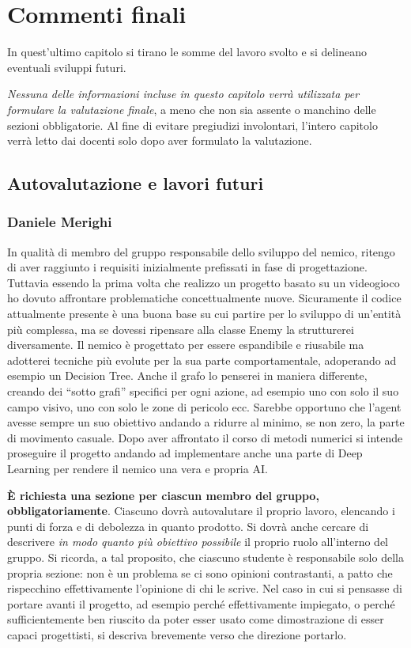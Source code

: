 \documentclass[a4paper,12pt]{report}
\begin{document}
\chapter{Commenti finali}

In quest'ultimo capitolo si tirano le somme del lavoro svolto e si delineano eventuali sviluppi
futuri.

\textit{Nessuna delle informazioni incluse in questo capitolo verrà utilizzata per formulare la valutazione finale}, a meno che non sia assente o manchino delle sezioni obbligatorie.
%
Al fine di evitare pregiudizi involontari, l'intero capitolo verrà letto dai docenti solo dopo aver formulato la valutazione.

\section{Autovalutazione e lavori futuri}
\subsection{Daniele Merighi}
\par
In qualità di membro del gruppo responsabile dello sviluppo del nemico, ritengo di aver raggiunto i requisiti inizialmente prefissati in fase di progettazione. Tuttavia essendo la prima volta che realizzo un progetto basato su un videogioco ho dovuto affrontare problematiche concettualmente nuove. Sicuramente il codice attualmente presente è una buona base su cui partire per lo sviluppo di un’entità più complessa, ma se dovessi ripensare alla classe Enemy la strutturerei diversamente. Il nemico è progettato per essere espandibile e riusabile ma adotterei tecniche più evolute per la sua parte comportamentale, adoperando ad esempio un Decision Tree. Anche il grafo lo penserei in maniera differente, creando dei “sotto grafi” specifici per ogni azione, ad esempio uno con solo il suo campo visivo, uno con solo le zone di pericolo ecc. Sarebbe opportuno che l’agent avesse sempre un suo obiettivo andando a ridurre al minimo, se non zero, la parte di movimento casuale. Dopo aver affrontato il corso di metodi numerici si intende proseguire il progetto andando ad implementare anche una parte di Deep Learning per rendere il nemico una vera e propria AI.

\textbf{È richiesta una sezione per ciascun membro del gruppo, obbligatoriamente}.
%
Ciascuno dovrà autovalutare il proprio lavoro, elencando i punti di forza e di debolezza in quanto prodotto.
Si dovrà anche cercare di descrivere \emph{in modo quanto più obiettivo possibile} il proprio ruolo all'interno del gruppo.
Si ricorda, a tal proposito, che ciascuno studente è responsabile solo della propria sezione: non è un problema se ci sono opinioni contrastanti, a patto che rispecchino effettivamente l'opinione di chi le scrive.
Nel caso in cui si pensasse di portare avanti il progetto, ad esempio perché effettivamente impiegato, o perché sufficientemente ben riuscito da poter esser usato come dimostrazione di esser capaci progettisti, si descriva brevemente verso che direzione portarlo.
\end{document}
